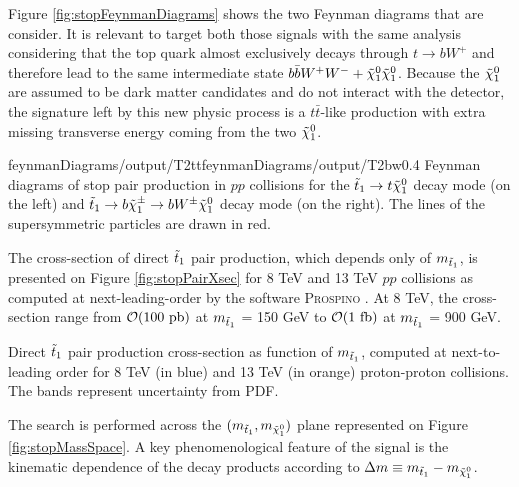         Figure \ref{fig:stopFeynmanDiagrams} shows the two Feynman diagrams that are consider. It is relevant
        to target both those signals with the same analysis considering that the top quark almost exclusively
        decays through $t \rightarrow b W^+$ and therefore lead to the same intermediate state 
        $b \bar{b} W^+ W^- + \tilde{\chi}_1^0 \tilde{\chi}_1^0$. Because the $\tilde{\chi}_1^0$ are assumed to be dark matter
        candidates and do not interact with the detector, the signature left by this new physic process
        is a $t\bar{t}$-like production with extra missing transverse energy coming from the two $\tilde{\chi}_1^0$.

                         {feynmanDiagrams/output/T2tt}{feynmanDiagrams/output/T2bw}{0.4}
                         {Feynman diagrams of stop pair production in $pp$ collisions for the 
                         $\tilde{t}_1 \rightarrow t \tilde{\chi}_1^0$ decay mode (on the left) and 
                         $\tilde{t}_1 \rightarrow b \tilde{\chi}_1^\pm \rightarrow b W^{\pm} \tilde{\chi}_1^0$ decay mode 
                         (on the right). The lines of the supersymmetric particles are drawn in red.}

        The cross-section of direct $\tilde{t}_1$ pair production, which depends only of $m_{\tilde{t}_1}$, is presented 
        on Figure \ref{fig:stopPairXsec} for 8 TeV and 13 TeV $pp$ collisions as computed at next-leading-order 
        by the software \textsc{Prospino} . At 8 TeV, the cross-section range from $\mathcal{O}(100 \text{ pb})$
        at $m_{\tilde{t}_1}$ = 150 GeV to $\mathcal{O}(1 \text{ fb})$ at $m_{\tilde{t}_1}$ = 900 GeV.

        {Direct $\tilde{t}_1$ pair production cross-section as function of $m_{\tilde{t}_1}$, computed at next-to-leading order
        for 8 TeV (in blue) and 13 TeV (in orange) proton-proton collisions. The bands represent uncertainty from PDF.}

        The search is performed across the $(m_{\tilde{t}_1},m_{\tilde{\chi}_1^0})$ plane 
        represented on Figure \ref{fig:stopMassSpace}. A key phenomenological feature of the signal is the
        kinematic dependence of the decay products according to $\Delta m \equiv m_{\tilde{t}_1} - m_{\tilde{\chi}_1^0}$.



